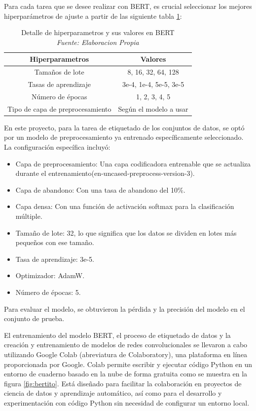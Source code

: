 Para cada tarea que se desee realizar con BERT, es crucial seleccionar los mejores hiperparámetros de ajuste a partir de las siguiente tabla \ref{tbl:2}:

\begin{table}[!ht]
	\centering
	\begin{tabular}{|c|c|}
		\hline
		\textbf{Hiperparametros} & \textbf{Valores} \\ \hline
		Tamaños de lote & 8, 16, 32, 64, 128 \\ \hline
		Tasas de aprendizaje & 3e-4, 1e-4, 5e-5, 3e-5 \\ \hline
		Número de épocas &  1, 2, 3, 4, 5 \\ \hline
		Tipo de capa de preprocesamiento & Según el modelo a usar \\ \hline
	\end{tabular}
	\caption[Detalle de hiperparametros y sus valores en BERT]{Detalle de hiperparametros y sus valores en BERT
		\\\textit{Fuente: Elaboracion Propia}}
	\label{tbl:2}
\end{table}

En este proyecto, para la tarea de etiquetado de los conjuntos de datos, se optó por un modelo de preprocesamiento ya entrenado específicamente seleccionado. La configuración específica incluyó:

\begin{itemize}

\item Capa de preprocesamiento: Una capa codificadora entrenable que se actualiza durante el entrenamiento(en-uncased-preprocess-version-3).
\item Capa de abandono: Con una tasa de abandono del 10\%.
\item Capa densa: Con una función de activación softmax para la clasificación múltiple.
\item Tamaño de lote: 32, lo que significa que los datos se dividen en lotes más pequeños con ese tamaño.
\item Tasa de aprendizaje: 3e-5.
\item Optimizador: AdamW.
\item Número de épocas: 5.

\end{itemize}

Para evaluar el modelo, se obtuvieron la pérdida y la precisión del modelo en el conjunto de prueba.

El entrenamiento del modelo BERT, el proceso de etiquetado de datos y la creación y entrenamiento de modelos de redes convolucionales se llevaron a cabo utilizando Google Colab (abreviatura de Colaboratory), una plataforma en línea proporcionada por Google. Colab permite escribir y ejecutar código Python en un entorno de cuaderno basado en la nube de forma gratuita como se muestra en la figura \ref{fig:bertito}. Está diseñado para facilitar la colaboración en proyectos de ciencia de datos y aprendizaje automático, así como para el desarrollo y experimentación con código Python sin necesidad de configurar un entorno local.


